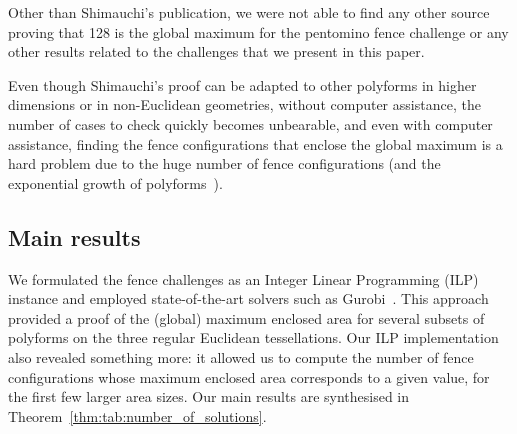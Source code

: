 \documentclass{amsart}
\theoremstyle{definition}
\theoremstyle{remark}
\begin{document}
	Other than Shimauchi's publication, we were not able to find any other source proving that 128 is the global maximum for the pentomino fence challenge or any other results related to the challenges that we present in this paper. 
	
	
	Even though Shimauchi's proof can be adapted to other polyforms in higher dimensions or in non-Euclidean geometries,  without computer assistance, the number of cases to check quickly becomes  unbearable, and even with computer assistance, finding the fence configurations that enclose the global maximum is a hard problem due to the huge number of fence configurations (and the exponential growth of polyforms~\cite{Eden61,klarner1965some}).
	
	
	\subsection{Main results}
	We formulated the fence challenges as an Integer Linear Programming (ILP) instance and employed state-of-the-art solvers such as Gurobi~\cite{HH18}. This approach provided a proof of the (global) maximum enclosed area for several subsets of polyforms on the three regular Euclidean  tessellations. Our ILP implementation also revealed something more: it allowed us to compute the number of fence configurations whose maximum enclosed area corresponds to a given value, for the first few larger area sizes. Our main results are synthesised in Theorem~\ref{thm:tab:number_of_solutions}.
	
\end{document}
